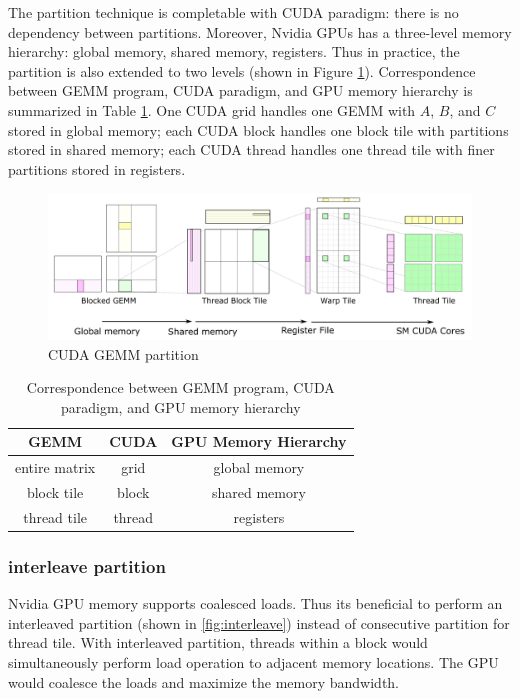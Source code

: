 \documentclass{article}
\begin{document}
The partition technique is completable with CUDA paradigm:
there is no dependency between partitions.
Moreover, Nvidia GPUs has a three-level memory hierarchy: global memory, shared memory, registers.
Thus in practice, the partition is also extended to two levels
(shown in Figure \ref{fig:complete-hierarchy}).
Correspondence between GEMM program, CUDA paradigm, and GPU memory hierarchy
is summarized in Table \ref{tab:hierarchy}.
One CUDA grid handles one GEMM with $A$, $B$, and $C$ stored in global memory;
each CUDA block handles one block tile with partitions stored in shared memory;
each CUDA thread handles one thread tile with finer partitions stored in registers.

\begin{figure}[h]
    \centering
    \includegraphics[width=\linewidth]{img/complete-hierarchy.png}
    \caption{CUDA GEMM partition}
    \label{fig:complete-hierarchy}
\end{figure}


\begin{table}[h]
    \centering
    \begin{tabular}{c|c|c}
    GEMM          & CUDA   & GPU Memory Hierarchy \\ \hline
    entire matrix & grid   & global memory \\
    block tile    & block  & shared memory \\
    thread tile   & thread & registers    
    \end{tabular}
    \caption{Correspondence between GEMM program, CUDA paradigm, and GPU memory hierarchy}
    \label{tab:hierarchy}
\end{table}

\subsubsection{interleave partition}
Nvidia GPU memory supports coalesced loads. 
Thus its beneficial to perform an interleaved partition (shown in \ref{fig:interleave}) 
instead of consecutive partition for thread tile.
With interleaved partition, threads within a block would simultaneously 
perform load operation to adjacent memory locations. 
The GPU would coalesce the loads and maximize the memory bandwidth.
\end{document}
